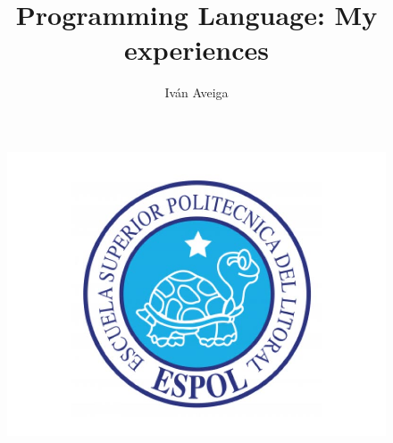 \documentclass[a4paper,11pt]{article}
\begin{document}
	\author{Iván Aveiga}
	\title{Programming Language: My experiences}
	\maketitle
	\begin{figure}[h]
	\centering
	\includegraphics[width=0.7\linewidth]{./logo}
	\end{figure}
	\newpage
	
	
	\clearpage
	
	\clearpage 
\end{document}
